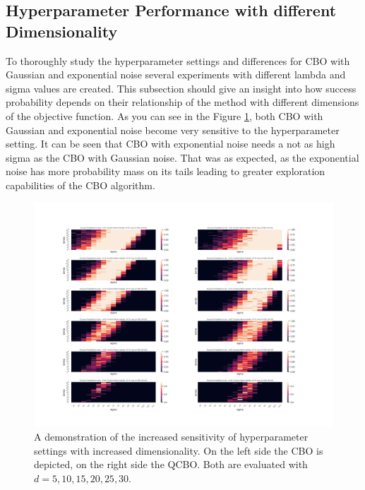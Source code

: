 \documentclass[a4paper, 11pt]{article}
\begin{document}
\subsection{Hyperparameter Performance with different Dimensionality}
To thoroughly study the hyperparameter settings and differences for CBO with Gaussian and exponential noise several experiments with different lambda and sigma values are created. This subsection should give an insight into how success probability depends on their relationship of the method with different dimensions of the objective function. As you can see in the Figure \ref{fig:d_sigma_lambda}, both CBO with Gaussian and exponential noise become very sensitive to the hyperparameter setting. It can be seen that CBO with exponential noise needs a not as high sigma as the CBO with Gaussian noise. That was as expected, as the exponential noise has more probability mass on its tails leading to greater exploration capabilities of the CBO algorithm.

\begin{figure}[!ht]
\centering
\includegraphics[width=1\textwidth]{imgs/d_sigma_lambda.png}

\caption{A demonstration of the increased sensitivity of hyperparameter settings with increased dimensionality. On the left side the CBO is depicted, on the right side the QCBO. Both are evaluated with $d=5,10,15,20,25,30$.} \vspace{-1em}
\label{fig:d_sigma_lambda}
\end{figure}

\end{document}
